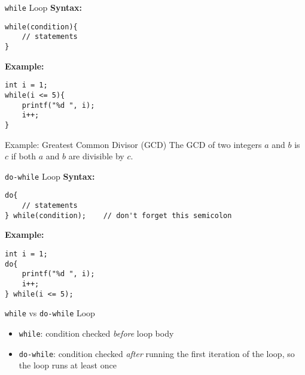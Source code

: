 \documentclass[12pt, aspectratio=169]{beamer}
\begin{document}
    \begin{frame}[fragile]{\texttt{while} Loop}
        \textbf{Syntax:}
        \begin{verbatim}
while(condition){
    // statements
}
        \end{verbatim}

        \textbf{Example:}
        \begin{verbatim}
int i = 1;
while(i <= 5){
    printf("%d ", i);
    i++;
}
        \end{verbatim}
    \end{frame}


    \begin{frame}{Example: Greatest Common Divisor (GCD)}
        The GCD of two integers $a$ and $b$ is $c$ if both $a$ and $b$ are divisible by $c$.

        
    \end{frame}


    \begin{frame}[fragile]{\texttt{do-while} Loop}
        \textbf{Syntax:}
        \begin{verbatim}
do{
    // statements
} while(condition);    // don't forget this semicolon
        \end{verbatim}

        \textbf{Example:}
        \begin{verbatim}
int i = 1;
do{
    printf("%d ", i);
    i++;
} while(i <= 5);
        \end{verbatim}
    \end{frame}


    \begin{frame}{\texttt{while} vs \texttt{do-while} Loop}
        \begin{itemize}
            \item \texttt{while}: condition checked \textit{before} loop body
            \item \texttt{do-while}: condition checked \textit{after} running the first iteration of the loop, so the loop runs at least once
        \end{itemize}
    \end{frame}
\end{document}
